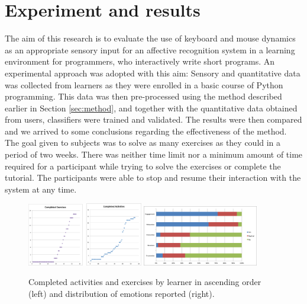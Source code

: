 \documentclass[a4paper,twoside]{article}
\begin{document}
\section{Experiment and results}
\label{sec:exp}
The aim of this research is to evaluate the use of keyboard
and mouse dynamics as an appropriate sensory input for an affective recognition
system in a learning environment for programmers,
who interactively write short programs. An experimental approach was adopted with this aim: Sensory and
quantitative data was collected from learners as they were enrolled in a basic
course of Python programming. This data was then pre-processed using the method
described earlier in Section \ref{sec:method}, and together with the quantitative data obtained from users,
classifiers were trained and validated. The results were then compared
and we arrived to some conclusions regarding the effectiveness of the method. The goal given to
subjects was to solve as many exercises as they could in a period of two weeks.
There was neither time limit nor a minimum amount of time required for a
participant while trying to solve the exercises or complete the tutorial. The
participants were able to stop and resume their interaction with the system at
any time.
%
\begin{figure}[!t] 
\centering 
\includegraphics[width=0.45\textwidth]{Completed.png} 
\includegraphics[width=0.45\textwidth]{classDist.png} 
\caption{Completed activities and exercises by learner in ascending order (left) and distribution of emotions reported (right).}
\label{fig_completed} 
\end{figure}
\end{document}
